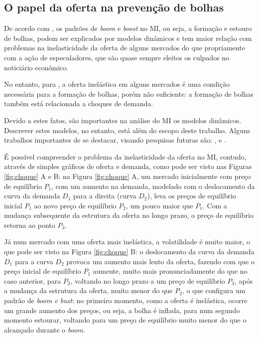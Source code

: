 \documentclass[
	12pt,				%
	oneside,			%
	a4paper,			%
	chapter=TITLE,		%
	section=TITLE,		%
	english,			%
	brazil				%
	]{abntex2}
\begin{document}
\begin{refsection}
{\subsection{O papel da oferta na prevenção de bolhas}\label{o-papel-da-oferta-na-prevenuxe7uxe3o-de-bolhas}}

De acordo com \textcite[p.~11]{regulation}, os padrões de \emph{boom} e \emph{boost} no \gls{MI},
ou seja, a formação e estouro de bolhas, podem ser explicados por modelos
dinâmicos e tem maior relação com problemas na inelasticidade da oferta de
alguns mercados do que propriamente com a ação de especuladores, que são quase
sempre eleitos os culpados no noticiário econômico.

No entanto, para \textcite[p.~1]{regulation}, a oferta inelástica em alguns mercados é
uma condição necessária para a formação de bolhas, porém não suficiente: a
formação de bolhas também está relacionada a choques de demanda.

Devido a estes fatos, são importantes na análise do \gls{MI} os modelos
dinâmicos. Descrever estes modelos, no entanto, está além do escopo deste
trabalho. Alguns trabalhos importantes de se destacar, visando pesquisas
futuras são: \textcite{wheaton1999}, \textcite{FAN201937} e \textcite{Malpezzi2002TheRO}.

É possível compreender o problema da inelasticidade da oferta no \gls{MI},
contudo, através de simples gráficos de oferta e demanda, como pode ser visto
nas Figuras \ref{fig:choque} A e B: na Figura \ref{fig:choque} A, um mercado
inicialmente com preço de equilíbrio \(P_1\), com um aumento na demanda, modelado
com o deslocamento da curva da demanda \(D_1\) para a direita (curva \(D_2\)), leva
os preços de equilíbrio inicial \(P_1\) ao novo preço de equilíbrio \(P_2\), um
pouco maior que \(P_1\). Com a mudança subsequente da estrutura da oferta no longo
prazo, o preço de equilíbrio retorna ao ponto \(P_3\).

Já num mercado com uma oferta mais inelástica, a volatilidade é muito maior, o
que pode ser visto na Figura \ref{fig:choque} B: o deslocamento da curva da
demanda \(D_1\) para a curva \(D_2\) provoca um aumento mais lento da oferta, fazendo
com que o preço inicial de equilíbrio \(P_1\) aumente, muito mais pronunciadamente
do que no caso anterior, para \(P_2\), voltando no longo prazo a um preço de
equilíbrio \(P_3\), após a mudança da estrutura da oferta, muito menor do que
\(P_2\), o que configura um padrão de \emph{boom e bust}: no primeiro momento, como a
oferta é inelástica, ocorre um grande aumento dos preços, ou seja, a bolha é
inflada, para num segundo momento estourar, voltando para um preço de equilíbrio
muito menor do que o alcançado durante o \emph{boom}.
\begin{figure}[H]


\end{figure}
\end{refsection}
\end{document}
